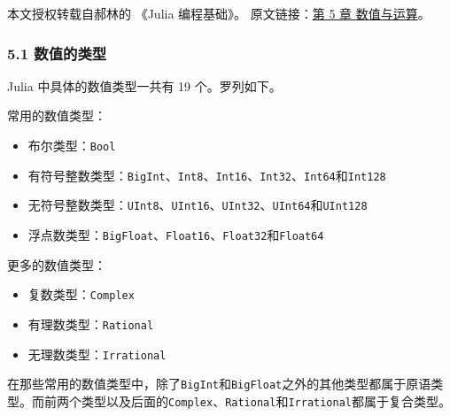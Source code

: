 
本文授权转载自郝林的 《Julia 编程基础》。 原文链接：\href{https://github.com/hyper0x/JuliaBasics/blob/master/book/ch05.md}{第 5 章 数值与运算}。


\subsubsection{5.1 数值的类型}

Julia 中具体的数值类型一共有 19 个。罗列如下。

常用的数值类型：

\begin{itemize}
\item 布尔类型：\verb`Bool`
\item  有符号整数类型：\verb`BigInt`、\verb`Int8`、\verb`Int16`、\verb`Int32`、\verb`Int64`和\verb`Int128`
\item  无符号整数类型：\verb`UInt8`、\verb`UInt16`、\verb`UInt32`、\verb`UInt64`和\verb`UInt128`
\item  浮点数类型：\verb`BigFloat`、\verb`Float16`、\verb`Float32`和\verb`Float64`
\end{itemize}

更多的数值类型：

\begin{itemize}
\item 复数类型：\verb`Complex`
\item 有理数类型：\verb`Rational`
\item 无理数类型：\verb`Irrational`
\end{itemize}

在那些常用的数值类型中，除了\verb`BigInt`和\verb`BigFloat`之外的其他类型都属于原语类型。而前两个类型以及后面的\verb`Complex`、\verb`Rational`和\verb`Irrational`都属于复合类型。
